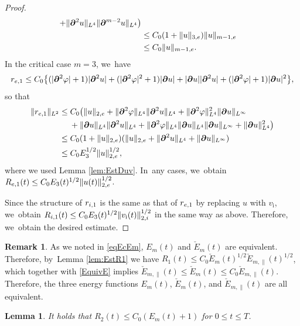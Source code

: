 \documentclass[11pt]{article}
\newtheorem{lemma}[theorem]{Lemma}
\theoremstyle{definition}
\newtheorem{remark}[theorem]{Remark}
\begin{document}
\begin{proof}
\begin{align*}
+ \|\bm{\partial}^2u\|_{L^4}\|\bm{\partial}^{m-2}u\|_{L^4} \bigr) \\
&\leq C_0(1+\|u\|_{3,{\rm e}})\|u\|_{m-1,{\rm e}} \\
&\leq C_0\|u\|_{m-1,{\rm e}}.
\end{align*}
In the critical case $m=3$, we~have
\[
r_{{\rm e},1}
\leq C_0 \bigl\{ (|\bm{\partial}^2\varphi|+1)|\bm{\partial}^2u| + (|\bm{\partial}^2\varphi|^2+1)|\bm{\partial}u|
+ |\bm{\partial}u||\bm{\partial}^2u| + (|\bm{\partial}^2\varphi|+1)|\bm{\partial}u|^2\bigr\},
\]
so that
\begin{align*}
\|r_{{\rm e},1}\|_{L^2}
&\leq C_0 \bigl(\|u\|_{2,{\rm e}} + \|\bm{\partial}^2\varphi\|_{L^4}\|\bm{\partial}^2u\|_{L^4} + \|\bm{\partial}^2\varphi\|_{L^4}^2\|\bm{\partial}u\|_{L^\infty} \\
&\quad\;
+ \|\bm{\partial}u\|_{L^4}\|\bm{\partial}^2u\|_{L^4} + \|\bm{\partial}^2\varphi\|_{L^4}\|\bm{\partial}u\|_{L^4}\|\bm{\partial}u\|_{L^\infty}
+ \|\bm{\partial}u\|_{L^4}^2 \bigr) \\
&\leq C_0 (1+\|u\|_{2,{\rm e}})(\|u\|_{2,{\rm e}}+\|\bm{\partial}^2u\|_{L^4}+\|\bm{\partial}u\|_{L^\infty}) \\
&\leq C_0 E_3^{1/2} \|u\|_{2,{\rm e}}^{1/2},
\end{align*}
where we used Lemma \ref{lem:EstDuv}. In~any cases, we~obtain $R_{{\rm e},1}(t) \leq C_0 E_3(t)^{1/2} \|u(t)\|_{2,{\rm e}}^{1/2}$.

Since the structure of $r_{{\rm i},1}$ is the same as that of $r_{{\rm e},1}$ by replacing $u$ with $v_\mathrm{i}$, we~obtain $R_{{\rm i},1}(t) \leq C_0 E_3(t)^{1/2} \|v_\mathrm{i}(t)\|_{2,{\rm i}}^{1/2}$ in the same way as above.
Therefore, we~obtain the desired estimate.
\end{proof}

\begin{remark}\label{re:EFs}
As we noted in \eqref{eqEcEm}, $E_m(t)$ and $\check{E}_m(t)$ are equivalent.
Therefore, by~Lemma \ref{lem:EstR1} we have $R_1(t) \leq C_0\check{E}_m(t)^{1/2}\check{E}_{m,\parallel}(t)^{1/2}$,
which together with \eqref{EquivE} implies $\check{E}_{m,\parallel}(t) \leq \check{E}_m(t) \leq C_0\check{E}_{m,\parallel}(t)$.
Therefore, the three energy functions $E_m(t)$, $\check{E}_m(t)$, and $\check{E}_{m,\parallel}(t)$ are all equivalent.
\end{remark}

\begin{lemma}\label{lem:EstR2}
It holds that $R_2(t) \leq C_0(E_m(t)+1)$ for $0\leq t\leq T$.
\end{lemma}
\end{document}
